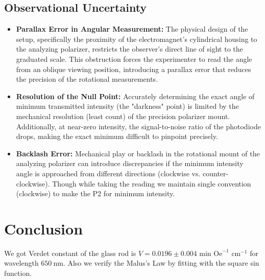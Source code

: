 \subsection{Observational Uncertainty}
\begin{itemize}
    \item \textbf{Parallax Error in Angular Measurement:} The physical design of the setup, specifically the proximity of the electromagnet's cylindrical housing to the analyzing polarizer, restricts the observer's direct line of sight to the graduated scale. This obstruction forces the experimenter to read the angle from an oblique viewing position, introducing a parallax error that reduces the precision of the rotational measurements.
    \item \textbf{Resolution of the Null Point:} Accurately determining the exact angle of minimum transmitted intensity (the "darkness" point) is limited by the mechanical resolution (least count) of the precision polarizer mount. Additionally, at near-zero intensity, the signal-to-noise ratio of the photodiode drops, making the exact minimum difficult to pinpoint precisely.
    \item \textbf{Backlash Error:} Mechanical play or backlash in the rotational mount of the analyzing polarizer can introduce discrepancies if the minimum intensity angle is approached from different directions (clockwise vs. counter-clockwise). Though while taking the reading we maintain single convention (clockwise) to make the P2 for minimum intensity.
\end{itemize}

\section{Conclusion}
We got Verdet constant of the glass rod is $V = 0.0196 \pm 0.004 \text{ min Oe}^{-1} \text{ cm}^{-1}$ for wavelength $650 \ \text{nm}$. Also we verify the Malus's Law by fitting with the square sin function.
